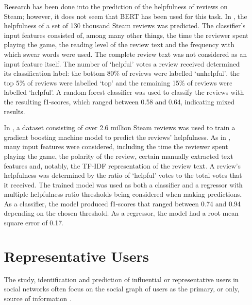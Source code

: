 Research has been done into the prediction of the helpfulness of reviews on Steam; however, it does not seem that BERT has been used for this task. In \cite{eberhard2018investigating}, the helpfulness of a set of 130 thousand Steam reviews was predicted. The classifier's input features consisted of, among many other things, the time the reviewer spent playing the game, the reading level of the review text and the frequency with which swear words were used. The complete review text was not considered as an input feature itself. The number of `helpful' votes a review received determined its classification label: the bottom 80\% of reviews were labelled `unhelpful', the top 5\% of reviews were labelled `top' and the remaining 15\% of reviews were labelled `helpful'. A random forest classifier was used to classify the reviews with the resulting f1-scores, which ranged between 0.58 and 0.64, indicating mixed results.

In \cite{baowaly2019predicting}, a dataset consisting of over 2.6 million Steam reviews was used to train a gradient boosting machine model to predict the reviews' helpfulness. As in \cite{eberhard2018investigating}, many input features were considered, including the time the reviewer spent playing the game, the polarity of the review, certain manually extracted text features and, notably, the TF-IDF representation of the review text. A review's helpfulness was determined by the ratio of `helpful' votes to the total votes that it received. The trained model was used as both a classifier and a regressor with multiple helpfulness ratio thresholds being considered when making predictions. As a classifier, the model produced f1-scores that ranged between 0.74 and 0.94 depending on the chosen threshold. As a regressor, the model had a root mean square error of 0.17.

\section{Representative Users} \label{sec:LR_Rep}

The study, identification and prediction of influential or representative users in social networks often focus on the social graph of users as the primary, or only, source of information \cite{trusov2010determining} \cite{ghosh2010predicting}.

